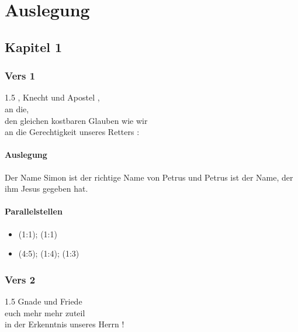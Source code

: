\documentclass[12pt]{mybibreport}
\begin{document}
\chapter{Auslegung}
\section{Kapitel 1}
\subsection{Vers \textbf{1}}
\begin{spacing}{1.5}
 , Knecht und Apostel , \\
    an die, \\
         den gleichen kostbaren Glauben wie wir \\
        an die Gerechtigkeit unseres   Retters :
\end{spacing}
\subsubsection{Auslegung}
    \begin{itshape}
        Der Name Simon ist der richtige Name von Petrus und Petrus ist der Name, der ihm Jesus gegeben hat.
    \end{itshape}
\subsubsection{Parallelstellen}
    \begin{itemize}
        \item {} (1:1); (1:1)
        \item {} (4:5); (1:4); (1:3)
    \end{itemize}

\subsection{Vers \textbf{2}}
\begin{spacing}{1.5}
Gnade und Friede \\
      euch mehr  mehr zuteil \\
    in der Erkenntnis  unseres Herrn !
\end{spacing}
\end{document}
